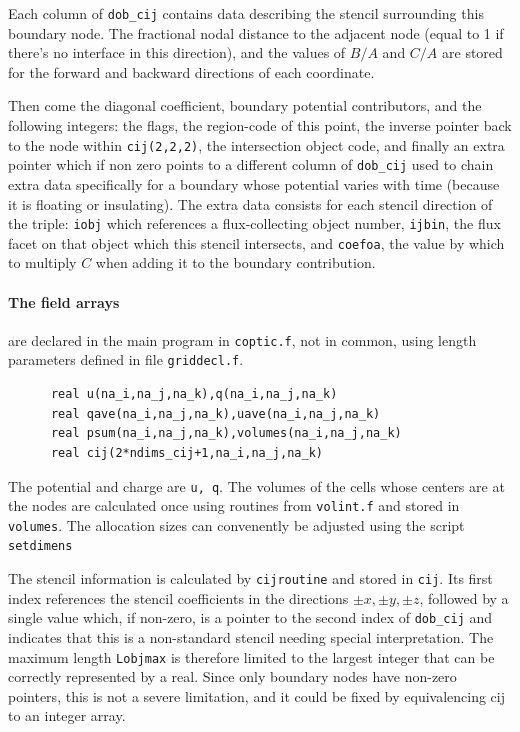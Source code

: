 \documentclass[12pt]{article}
\begin{document}
Each column of \verb!dob_cij! contains data describing the stencil
surrounding this boundary node. The fractional nodal distance to the
adjacent node (equal to 1 if there's no interface in this direction), and the
values of $B/A$ and $C/A$ are stored for the forward and backward
directions of each coordinate. 

Then come the diagonal coefficient, boundary potential contributors,
and the following integers: the flags, the region-code of this point,
the inverse pointer back to the node within \verb!cij(2,2,2)!, the
intersection object code, and finally an extra pointer which if non
zero points to a different column of \verb!dob_cij! used to chain
extra data specifically for a boundary whose potential varies with
time (because it is floating or insulating). The extra data consists
for each stencil direction of the triple: \verb!iobj! which references a
flux-collecting object number, \verb!ijbin!, the flux facet on that
object which this stencil intersects, and \verb!coefoa!, the value by
which to multiply $C$ when adding it to the boundary contribution.


\paragraph{The field arrays} are declared in the main program in \verb!coptic.f!,
not in common, using length parameters defined in file \verb!griddecl.f!.
\begin{verbatim}
      real u(na_i,na_j,na_k),q(na_i,na_j,na_k)
      real qave(na_i,na_j,na_k),uave(na_i,na_j,na_k)
      real psum(na_i,na_j,na_k),volumes(na_i,na_j,na_k)
      real cij(2*ndims_cij+1,na_i,na_j,na_k)
\end{verbatim}
The potential and charge are \verb!u, q!. The volumes of the cells
whose centers are at the nodes are calculated once using routines from
\verb!volint.f! and stored in \verb!volumes!. The allocation sizes can
convenently be adjusted using the script \verb!setdimens!

The stencil information is calculated by \verb!cijroutine! and stored
in \verb!cij!. Its first index references the stencil coefficients in
the directions $\pm x, \pm y, \pm z$, followed by a single value
which, if non-zero, is a pointer to the second index of \verb!dob_cij!
and indicates that this is a non-standard stencil needing special
interpretation. The maximum length \verb!Lobjmax! is therefore limited
to the largest integer that can be correctly represented by a
real. Since only boundary nodes have non-zero pointers, this is not a
severe limitation, and it could be fixed by equivalencing cij to an
integer array.
\end{document}
